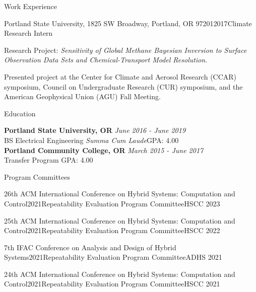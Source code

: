 \documentclass{resume}
\begin{document}
\begin{rSection}{Work Experience}
\begin{rSubsection}{Portland State University, 1825 SW Broadway, Portland, OR 97201}{2017}{Climate Research Intern}{}
\item Research Project: \textit{Sensitivity of Global Methane Bayesian Inversion to Surface Observation Data Sets and Chemical-Transport Model Resolution}.
\item Presented project at the Center for Climate and Aerosol Research (CCAR) symposium,
Council on Undergraduate Research (CUR) symposium, and the American Geophysical
Union (AGU) Fall Meeting.
\end{rSubsection}
\end{rSection}

\begin{rSection}{Education}

{\bf Portland State University, OR} \hfill {\em June 2016 - June 2019} 
\\ BS Electrical Engineering \quad \textit{Summa Cum Laude}\hfill {GPA: 4.00}
\\{\bf Portland Community College, OR} \hfill {\em March 2015 - June 2017} 
\\ Transfer Program \hfill {GPA: 4.00}

\end{rSection}

\begin{rSection}{Program Committees}

\begin{rSubsectionEmpty}{26th ACM International Conference on Hybrid Systems: Computation and Control}{2021}{Repeatability Evaluation Program Committee}{HSCC 2023}
\end{rSubsectionEmpty}

\begin{rSubsectionEmpty}{25th ACM International Conference on Hybrid Systems: Computation and Control}{2021}{Repeatability Evaluation Program Committee}{HSCC 2022}
\end{rSubsectionEmpty}


\begin{rSubsectionEmpty}{7th IFAC Conference on Analysis and Design of Hybrid Systems}{2021}{Repeatability Evaluation Program Committee}{ADHS 2021}
\end{rSubsectionEmpty}

\begin{rSubsectionEmpty}{24th ACM International Conference on Hybrid Systems: Computation and Control}{2021}{Repeatability Evaluation Program Committee}{HSCC 2021}
\end{rSubsectionEmpty}

\end{rSection}
\end{document}
